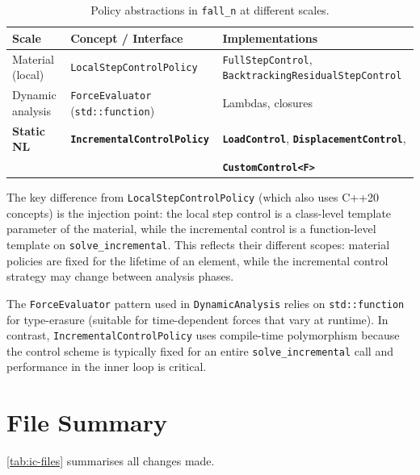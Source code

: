 \begin{table}[ht]
  \centering
  \caption{Policy abstractions in \texttt{fall\_n} at different scales.}
  \label{tab:ic-policy-summary}
  \begin{tabular}{lll}
    \toprule
    Scale & Concept / Interface & Implementations \\
    \midrule
    Material (local) & \texttt{LocalStepControlPolicy}
      & \texttt{FullStepControl},
        \texttt{BacktrackingResidualStepControl} \\
    Dynamic analysis & \texttt{ForceEvaluator} (\texttt{std::function})
      & Lambdas, closures \\
    \textbf{Static NL}
      & \textbf{\texttt{IncrementalControlPolicy}}
      & \textbf{\texttt{LoadControl}},
        \textbf{\texttt{DisplacementControl}}, \\
      & & \textbf{\texttt{CustomControl<F>}} \\
    \bottomrule
  \end{tabular}
\end{table}

The key difference from \texttt{LocalStepControlPolicy} (which also
uses C++20 concepts) is the injection point: the local step control
is a class-level template parameter of the material, while the
incremental control is a function-level template on
\texttt{solve\_incremental}.  This reflects their different scopes:
material policies are fixed for the lifetime of an element, while
the incremental control strategy may change between analysis phases.

The \texttt{ForceEvaluator} pattern used in
\texttt{DynamicAnalysis} relies on \texttt{std::function} for
type-erasure (suitable for time-dependent forces that vary at
runtime).  In contrast, \texttt{IncrementalControlPolicy} uses
compile-time polymorphism because the control scheme is typically
fixed for an entire \texttt{solve\_incremental} call and
performance in the inner loop is critical.

\section{File Summary}
\label{sec:ic-files}

\autoref{tab:ic-files} summarises all changes made.

